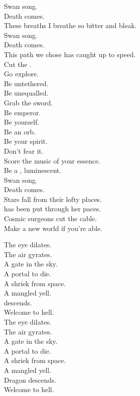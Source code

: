 Swan song. \\
Death comes. \\
These breaths I breathe so bitter and bleak. \\
Swan song. \\
Death comes. \\
This path we chose has caught up to speed. \\

Cut the . \\
Go explore. \\
Be untethered. \\
Be unequalled. \\
Grab the sword. \\
Be emperor. \\
Be yourself. \\
Be an orb. \\
Be your spirit. \\
Don't fear it. \\
Score the music of your essence. \\
Be a , luminescent. \\
Swan song. \\
Death comes. \\

Stars fall from their lofty places. \\
 has been put through her paces. \\
Cosmic surgeons cut the cable. \\
Make a new world if you're able. \\


The eye dilates. \\
The air gyrates. \\
A gate in the sky. \\
A portal to die. \\
A shriek from space. \\
A mangled yell. \\
 descends. \\
Welcome to hell. \\

The eye dilates. \\
The air gyrates. \\
A gate in the sky. \\
A portal to die. \\
A shriek from space. \\
A mangled yell. \\
Dragon descends. \\
Welcome to hell. \\

